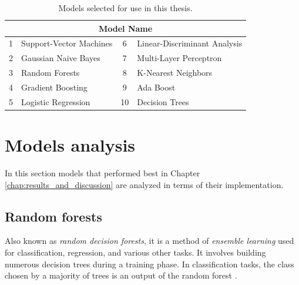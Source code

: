         \begin{table}[htbp]
            \centering
            \caption{Models selected for use in this thesis.}
            \label{tab:movements_table}
            \begin{tabular}{@{}clcl@{}}
                \toprule
                \multicolumn{4}{c}{\textbf{Model Name}} \\
                \midrule
                1 & Support-Vector Machines & 6 & Linear-Discriminant Analysis \\
                2 & Gaussian Naive Bayes & 7 & Multi-Layer Perceptron \\
                3 & Random Forests & 8 & K-Nearest Neighbors \\
                4 & Gradient Boosting & 9 & Ada Boost \\
                5 & Logistic Regression & 10 & Decision Trees \\
                \bottomrule
            \end{tabular}
        \end{table}
    
    \section{Models analysis}
        
        In this section models that performed best in Chapter \ref{chap:results_and_discussion} are analyzed in terms of their implementation.

        \subsection{Random forests}
           Also known as \textit{random decision forests}, it is a method of \textit{ensemble learning} used for classification, regression, and various other tasks. It involves building numerous decision trees during a training phase. In classification tasks, the class chosen by a majority of trees is an output of the random forest \cite{ho_random_1998}.

